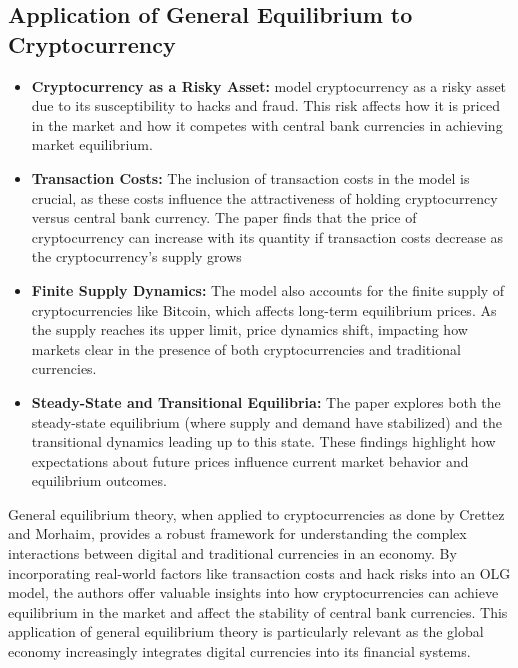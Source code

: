 \subsection{Application of General Equilibrium to Cryptocurrency}

    \begin{itemize}
        \item \textbf{Cryptocurrency as a Risky Asset:}  model cryptocurrency as a risky asset due to its susceptibility to hacks and fraud. This risk affects how it is priced in the market and how it competes with central bank currencies in achieving market equilibrium.
        \item \textbf{Transaction Costs:} The inclusion of transaction costs in the model is crucial, as these costs influence the attractiveness of holding cryptocurrency versus central bank currency. The paper finds that the price of cryptocurrency can increase with its quantity if transaction costs decrease as the cryptocurrency's supply grows
        \item \textbf{Finite Supply Dynamics:} The model also accounts for the finite supply of cryptocurrencies like Bitcoin, which affects long-term equilibrium prices. As the supply reaches its upper limit, price dynamics shift, impacting how markets clear in the presence of both cryptocurrencies and traditional currencies.
        \item \textbf{Steady-State and Transitional Equilibria:} The paper explores both the steady-state equilibrium (where supply and demand have stabilized) and the transitional dynamics leading up to this state. These findings highlight how expectations about future prices influence current market behavior and equilibrium outcomes.
    \end{itemize}

General equilibrium theory, when applied to cryptocurrencies as done by Crettez and Morhaim, provides a robust framework for understanding the complex interactions between digital and traditional currencies in an economy. By incorporating real-world factors like transaction costs and hack risks into an OLG model, the authors offer valuable insights into how cryptocurrencies can achieve equilibrium in the market and affect the stability of central bank currencies. This application of general equilibrium theory is particularly relevant as the global economy increasingly integrates digital currencies into its financial systems.     

